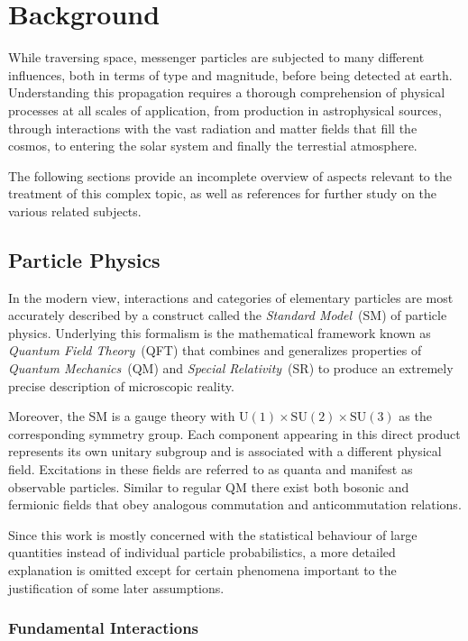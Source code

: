 \chapter{Background}
\label{ch:background}

While traversing space, messenger particles are subjected to many different influences, both in terms of type and magnitude, before being
detected at earth. Understanding this propagation requires a thorough comprehension of physical processes at all scales of application,
from production in astrophysical sources, through interactions with the vast radiation and matter fields that fill the cosmos, to entering
the solar system and finally the terrestial atmosphere.

The following sections provide an incomplete overview of aspects relevant to the treatment of this complex topic, as well as references
for further study on the various related subjects.

\section{Particle Physics}
\label{sec:particle}

In the modern view, interactions and categories of elementary particles are most accurately described by a construct called the
\emph{Standard Model}~(SM) of particle physics. Underlying this formalism is the mathematical framework known as
\emph{Quantum Field Theory}~(QFT) that combines and generalizes properties of \emph{Quantum Mechanics}~(QM) and
\emph{Special Relativity}~(SR) to produce an extremely precise description of microscopic reality.

Moreover, the SM is a gauge theory with $\text{U}(1) \times \text{SU}(2) \times \text{SU}(3)$ as the corresponding symmetry group.
Each component appearing in this direct product represents its own unitary subgroup and is associated with a different physical field.
Excitations in these fields are referred to as quanta and manifest as observable particles. Similar to regular QM there exist both
bosonic and fermionic fields that obey analogous commutation and anticommutation relations.

Since this work is mostly concerned with the statistical behaviour of large quantities instead of individual particle probabilistics,
a more detailed explanation is omitted except for certain phenomena important to the justification of some later assumptions.

\subsection*{Fundamental Interactions}
\label{sub:interactions}

